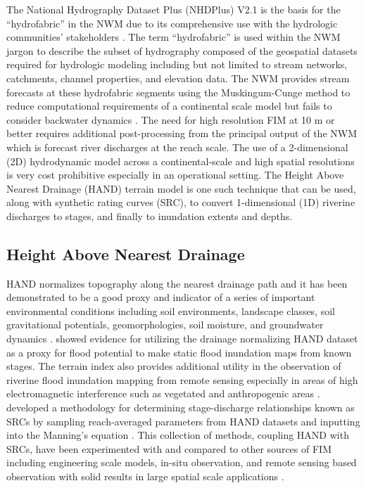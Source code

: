 The National Hydrography Dataset Plus (NHDPlus) V2.1 is the basis for the ``hydrofabric'' in the NWM due to its comprehensive use with the hydrologic communities' stakeholders \cite{mckay2012nhdplus,nhdplus2022vectors}. 
The term ``hydrofabric'' is used within the NWM jargon to describe the subset of hydrography composed of the geospatial datasets required for hydrologic modeling including but not limited to stream networks, catchments, channel properties, and elevation data. 
The NWM provides stream forecasts at these hydrofabric segments using the Muskingum-Cunge method to reduce computational requirements of a continental scale model but fails to consider backwater dynamics \cite{bedient2008hydrology,ponce1994variable,gochis2021wrf}.
The need for high resolution FIM at 10 m or better requires additional post-processing from the principal output of the NWM which is forecast river discharges at the reach scale.
The use of a 2-dimensional (2D) hydrodynamic model across a continental-scale and high spatial resolutions is very cost prohibitive especially in an operational setting.
The Height Above Nearest Drainage (HAND) terrain model is one such technique that can be used, along with synthetic rating curves (SRC), to convert 1-dimensional (1D) riverine discharges to stages, and finally to inundation extents and depths.
%
\subsection{Height Above Nearest Drainage}
%
HAND normalizes topography along the nearest drainage path and it has been demonstrated to be a good proxy and indicator of a series of important environmental conditions including soil environments, landscape classes, soil gravitational potentials, geomorphologies, soil moisture, and groundwater dynamics \cite{renno2008hand,nobre2011height}. 
 showed evidence for utilizing the drainage normalizing HAND dataset as a proxy for flood potential to make static flood inundation maps from known stages.
The terrain index also provides additional utility in the observation of riverine flood inundation mapping from remote sensing especially in areas of high electromagnetic interference such as vegetated and anthropogenic areas \cite{aristizabal2020high,shastry2019using,huang2017comparison,twele2016sentinel,aristizabal2021mapping}.
 developed a methodology for determining stage-discharge relationships known as SRCs by sampling reach-averaged parameters from HAND datasets and inputting into the Manning's equation \cite{gauckler1867etudes,manning1890flow}.
This collection of methods, coupling HAND with SRCs, have been experimented with and compared to other sources of FIM including engineering scale models, in-situ observation, and remote sensing based observation with solid results in large spatial scale applications \cite{godbout2019error,johnson2019integrated,garousi2019terrain,nobre2016hand,afshari2018comparison,zheng2018geoflood,teng2015rapid,teng2017flood,zhang2018comparative}.
%

